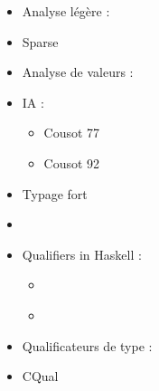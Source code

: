 \begin{itemize}
\item
  Analyse légère :
\item
  Sparse \cite{TorvaldsSparse}
\item
  Analyse de valeurs :
\item
  IA :
  \begin{itemize}
  \item
    Cousot 77 \cite{Cousot77}
  \item
    Cousot 92 \cite{Cousot92-1}
  \end{itemize}
\item
  Typage fort
\item
  \cite{TAPL}
\item
  Qualifiers in Haskell :
  \begin{itemize}
  \item
    \cite{lightweight-static-capabilities}
  \item
    \cite{LZ06a}
  \end{itemize}
\item
  Qualificateurs de type :
\item
  CQual \cite{pldi99,usenix01,pldi02,cquk-usenix04,toplas-quals}
\end{itemize}
